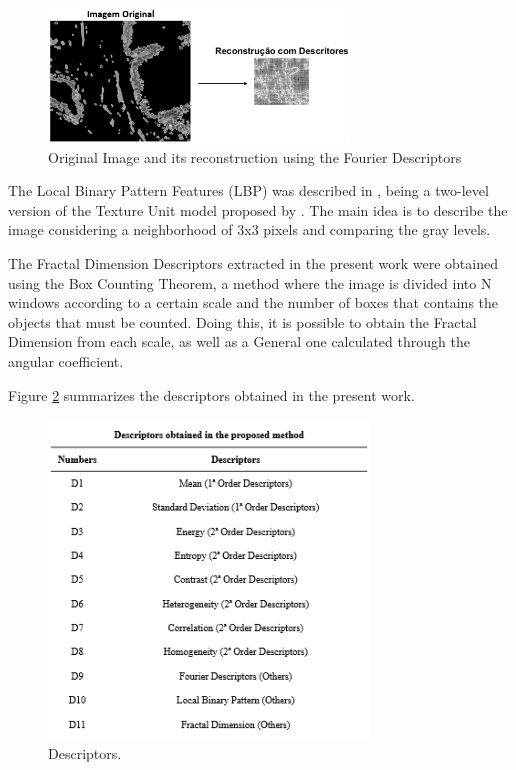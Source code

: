 \documentclass[conference]{IEEEtran}
\begin{document}
		\begin{figure}[h]
		    \centering
		    \includegraphics[width=8cm]{images/imagem_reconstrucao.png}
		    \caption{Original Image and its reconstruction using the Fourier Descriptors}
		    \label{fig:imagem_reconstrucao}
		\end{figure}
        \par The Local Binary Pattern Features (LBP) was described in \cite{lbp-OjalaPH96}, being a two-level version of the Texture Unit model proposed by \cite{Wang:1990:TCU:83597.83606}. The main idea is to describe the image considering a neighborhood of 3x3 pixels and comparing the gray levels.
		\par The Fractal Dimension Descriptors extracted in the present work were obtained using the Box Counting Theorem, a method where the image is divided into N windows according to a certain scale and the number of boxes that contains the objects that must be counted. Doing this, it is possible to obtain the Fractal Dimension from each scale, as well as a General one calculated through the angular coefficient.
		\par Figure \ref{fig:table_descriptors} summarizes the descriptors obtained in the present work. 
		\begin{figure}[h]
		    \centering
		    \includegraphics[width=8.5cm]{images/table_descriptors.png}
		    \caption{Descriptors.}
		    \label{fig:table_descriptors}
		\end{figure}
\end{document}
